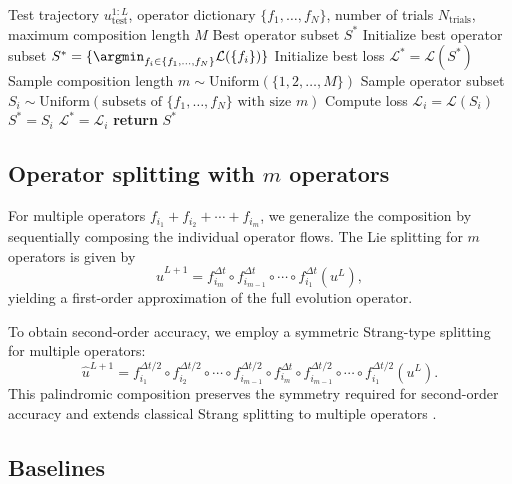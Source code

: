 \documentclass{article}
\newcommand{\RETURN}{\STATE \textbf{return }}
\theoremstyle{plain}
\theoremstyle{definition}
\theoremstyle{remark}
\begin{document}
\begin{algorithm}
\caption{Uniform Operator Composition Search}
\label{alg:random_search}
\begin{algorithmic}[1]
\REQUIRE Test trajectory $u_{\text{test}}^{1:L}$, operator dictionary $\{f_1, \ldots, f_N\}$, number of trials $N_{\text{trials}}$, maximum composition length $M$
\ENSURE Best operator subset $S^*$
\STATE Initialize best operator subset $S^* = \{\argmin_{f_i \in \{f_1, \ldots, f_N\}} \mathcal{L}(\{f_i\})\}$
\STATE Initialize best loss $\mathcal{L}^* = \mathcal{L}(S^*)$
    \STATE Sample composition length $m \sim \text{Uniform}(\{1, 2, \ldots, M\})$
    \STATE Sample operator subset $S_i \sim \text{Uniform}(\text{subsets of } \{f_1, \ldots, f_N\} \text{ with size } m)$
    \STATE Compute loss $\mathcal{L}_i = \mathcal{L}(S_i)$
        \STATE $S^* = S_i$
        \STATE $\mathcal{L}^* = \mathcal{L}_i$
    \ENDIF
\ENDFOR
\RETURN $S^*$
\end{algorithmic}
\end{algorithm}


\subsection{Operator splitting with $m$ operators}
\label{subsection-multiple-operator splitting}

For multiple operators $f_{i_1} + f_{i_2} + \cdots + f_{i_m}$, we generalize the composition by sequentially composing the individual operator flows.
The Lie splitting for $m$ operators is given by
\[
\hat{u}^{L+1}
=
f_{i_m}^{\Delta t}
\circ
f_{i_{m-1}}^{\Delta t}
\circ \cdots \circ
f_{i_1}^{\Delta t}
\left(u^L\right),
\]
yielding a first-order approximation of the full evolution operator.

To obtain second-order accuracy, we employ a symmetric Strang-type splitting for multiple operators:
\[
\hat{u}^{L+1}
=
f_{i_1}^{\Delta t/2}
\circ
f_{i_2}^{\Delta t/2}
\circ \cdots \circ
f_{i_{m-1}}^{\Delta t/2}
\circ
f_{i_m}^{\Delta t}
\circ
f_{i_{m-1}}^{\Delta t/2}
\circ \cdots \circ
f_{i_1}^{\Delta t/2}
\left(u^L\right).
\]
This palindromic composition preserves the symmetry required for second-order accuracy and extends classical Strang splitting to multiple operators \citep{Strang1968OnTC, Marchuk1990SplittingAA}.


\subsection{Baselines}
\end{document}
